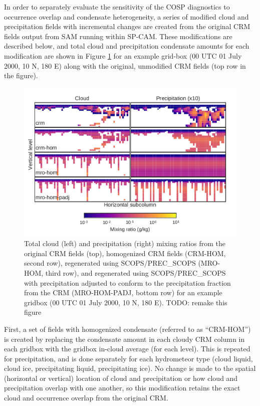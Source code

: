 In order to separately evaluate the sensitivity of the COSP diagnostics to occurrence overlap and condensate heterogeneity, a series of modified cloud and precipitation fields with incremental changes are created from the original CRM fields output from SAM running within SP-CAM. These modifications are described below, and total cloud and precipitation condensate amounts for each modification are shown in Figure \ref{sg_mxratio_example} for an example grid-box (00 UTC 01 July 2000, 10 N, 180 E) along with the original, unmodified CRM fields (top row in the figure).

\begin{figure}
    \centering
    \includegraphics[width=\columnwidth]{graphics/subgrid1_mxratio_example.pdf}
    \caption{Total cloud (left) and precipitation (right) mixing ratios from the original CRM fields (top), homogenized CRM fields (CRM-HOM, second row), regenerated using SCOPS/PREC\_SCOPS (MRO-HOM, third row), and regenerated using SCOPS/PREC\_SCOPS with precipitation adjusted to conform to the precipitation fraction from the CRM (MRO-HOM-PADJ, bottom row) for an example gridbox (00 UTC 01 July 2000, 10 N, 180 E). TODO: remake this figure}
    \label{sg_mxratio_example} 
\end{figure}

First, a set of fields with homogenized condensate (referred to as ``CRM-HOM'') is created by replacing the condensate amount in each cloudy CRM column in each gridbox with the gridbox in-cloud average (for each level). This is repeated for precipitation, and is done separately for each hydrometeor type (cloud liquid, cloud ice, precipitating liquid, precipitating ice). No change is made to the spatial (horizontal or vertical) location of cloud and precipitation or how cloud and precipitation overlap with one another, so this modification retains the exact cloud and occurrence overlap from the original CRM.

